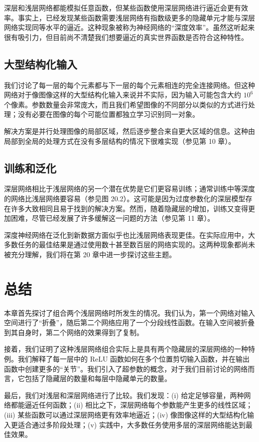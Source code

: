 \documentclass[lang=cn,newtx,10pt,scheme=chinese]{elegantbook}
\begin{document}
深层和浅层网络都能模拟任意函数，但某些函数使用深层网络进行逼近会更有效率。事实上，已经发现某些函数需要浅层网络有指数级更多的隐藏单元才能与深层网络实现同等水平的逼近。这种现象被称为神经网络的“深度效率”。虽然这听起来很有吸引力，但目前尚不清楚我们想要逼近的真实世界函数是否符合这种特性。

\subsection{大型结构化输入}

我们讨论了每一层的每个元素都与下一层的每个元素相连的完全连接网络。但这种网络对于像图像这样的大型结构化输入来说并不实际，因为输入可能包含大约 $10^6$ 个像素。参数数量会非常庞大，而且我们希望图像的不同部分以类似的方式进行处理；没有必要在图像的每个可能位置都独立学习识别同一对象。

解决方案是并行处理图像的局部区域，然后逐步整合来自更大区域的信息。这种由局部到全局的处理方式在没有多层结构的情况下很难实现（参见第 10 章）。

\subsection{训练和泛化}

深层网络相比于浅层网络的另一个潜在优势是它们更容易训练；通常训练中等深度的网络比浅层网络要容易（参见图 20.2）。这可能是因为过度参数化的深层模型存在许多大致相同且易于找到的解决方案。然而，随着隐藏层的增加，训练又变得更加困难，尽管已经发展了许多缓解这一问题的方法（参见第 11 章）。

深度神经网络在泛化到新数据方面似乎也比浅层网络表现更佳。在实际应用中，大多数任务的最佳结果是通过使用数十甚至数百层的网络实现的。这两种现象都尚未被充分理解，我们将在第 20 章中进一步探讨这些主题。

\section{总结}

本章首先探讨了组合两个浅层网络时所发生的情况。我们认为，第一个网络对输入空间进行了“折叠”，随后第二个网络应用了一个分段线性函数。在输入空间被折叠到其自身时，第二个网络的效果得到了复制。

接着，我们证明了这种浅层网络组合实际上是具有两个隐藏层的深层网络的一种特例。我们解释了每一层中的 ReLU 函数如何在多个位置剪切输入函数，并在输出函数中创建更多的“关节”。我们引入了超参数的概念，对于我们目前讨论的网络而言，它包括了隐藏层的数量和每层中隐藏单元的数量。

最后，我们对浅层和深层网络进行了比较。我们发现：(i) 给定足够容量，两种网络都能逼近任何函数；(ii) 相比之下，深层网络每个参数能产生更多的线性区域；(iii) 某些函数可以通过深层网络更有效率地逼近；(iv) 像图像这样的大型结构化输入更适合通过多阶段处理；(v) 实践中，大多数任务使用多层的深层网络能达到最佳效果。
\end{document}
